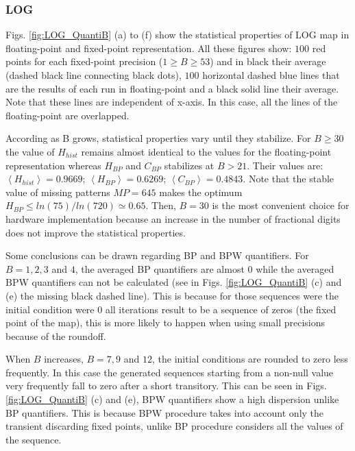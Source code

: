 \subsubsection{LOG} \label{subsubsec:log}

Figs. \ref{fig:LOG_QuantiB} (a) to (f) show the statistical properties of LOG map in floating-point and fixed-point representation.
All these figures show: $100$ red points for each fixed-point precision ($1\geq B \geq 53$) and in black their average (dashed black line connecting black dots), $100$ horizontal dashed blue lines that are the results of each run in floating-point and a black solid line their average.
Note that these lines are independent of x-axis.
In this case, all the lines of the floating-point are overlapped.

According as B grows, statistical properties vary until they stabilize.
For $B\geq 30$ the value of $H_{hist}$ remains almost identical to the values for the floating-point representation whereas $H_{BP}$ and $C_{BP}$ stabilizes at $B>21$.
Their values are: $\left\langle H_{hist}\right\rangle =0.9669$; $\left\langle H_{BP}\right\rangle =0.6269$; $\left\langle C_{BP}\right\rangle=0.4843$.
Note that the stable value of missing patterns $MP=645$ makes the optimum $H_{BP} \leq ln(75)/ln(720) \simeq 0.65$.
Then, $B=30$ is the most convenient choice for hardware implementation because an increase in the number of fractional digits does not improve the statistical properties.

Some conclusions can be drawn regarding BP and BPW quantifiers.
For $B=1, 2, 3$ and $4$, the averaged BP quantifiers are almost $0$ while the averaged BPW quantifiers can not be calculated (see in Figs. \ref{fig:LOG_QuantiB} (c) and (e) the missing black dashed line).
This is because for those sequences were the initial condition were $0$ all iterations result to be a sequence of zeros (the fixed point of the map), this is more likely to happen when using small precisions because of the roundoff.

When $B$ increases, $B=7, 9$ and $12$, the initial conditions are rounded to zero less frequently.
In this case the generated sequences starting from a non-null value very frequently fall to zero after a short transitory.
This can be seen in Figs.\ref{fig:LOG_QuantiB} (c) and (e), BPW quantifiers show a high dispersion unlike BP quantifiers.
This is because BPW procedure takes into account only the transient discarding fixed points, unlike BP procedure considers all the values of the sequence. 

